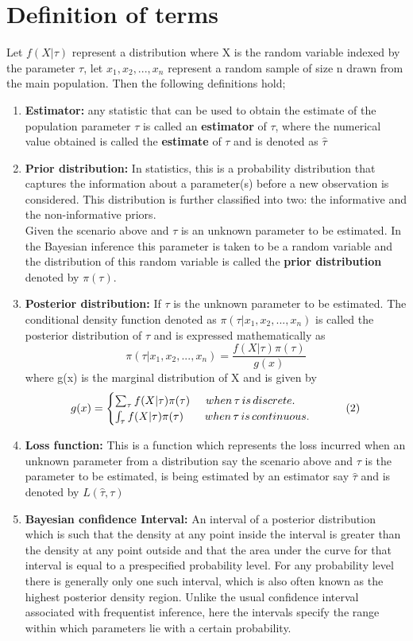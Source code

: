 \documentclass[a4paper,12pt]{report}
\newcommand{\para}{\hspace{0.5cm}}
\begin{document}
\section{Definition of terms}
Let $f(X|\tau)$ represent a distribution where X is the random variable indexed by the parameter $\tau$, let $x_1,x_2,...,x_n$ represent a random sample of size n drawn from the main population. Then the following definitions hold;
\begin{enumerate}
	\item  \textbf{Estimator:} any statistic that can be used to obtain the estimate of the population parameter $\tau$ is called an \textbf{estimator} of $\tau$, where the numerical value obtained is called the \textbf{estimate} of $\tau$ and is denoted as $\hat{\tau}$
	
	\item  \textbf{Prior distribution:} In statistics, this is a probability distribution that captures the information about a parameter(s) before a new observation is considered. This distribution is further classified into two: the informative and the non-informative priors.\\
	Given the scenario above and $\tau$ is an unknown parameter to be estimated. In the Bayesian inference this parameter is taken to be a random variable and the distribution of this random variable is called the \textbf{prior distribution} denoted by $\pi(\tau)$.

	\item  \textbf{Posterior distribution:} If $\tau$ is the unknown parameter to be estimated. The conditional density function denoted as $\pi(\tau|x_1,x_2,...,x_n)$ is called the posterior distribution of $\tau$ and is expressed mathematically as
	\[\pi(\tau|x_1,x_2,...,x_n)=\frac{f(X|\tau)\pi(\tau)}{g(x)} \tag{1}\]
	where g(x) is the marginal distribution of X and is given by
	\[g(x)=\begin{cases}
	\sum_{\tau}f(X|\tau)\pi(\tau)\para when \, \tau \, is \, discrete.\\\int_{\tau}f(X|\tau)\pi(\tau) \,\,\,\para when \, \tau \, is \, continuous.
	\end{cases}\tag{2}\]
	
	\item  \textbf{Loss function:} This is a function which represents the loss incurred when an unknown parameter from a distribution say the scenario above and $\tau$ is the parameter to be estimated, is being estimated by an estimator say $\hat{\tau}$ and is denoted by $L(\hat{\tau}, \tau)$
	
	\item  \textbf{Bayesian confidence Interval:} An interval of a posterior distribution which is such that the density at any point inside the interval is greater than the density at any point outside and that the area under the curve for that interval is equal to a prespecified probability level. For any probability level there is generally only one such interval, which is also often known as the highest posterior density region. Unlike the usual confidence interval associated with frequentist inference, here the intervals specify the range within which parameters lie with a certain probability.
\end{enumerate}
\newpage
\end{document}
